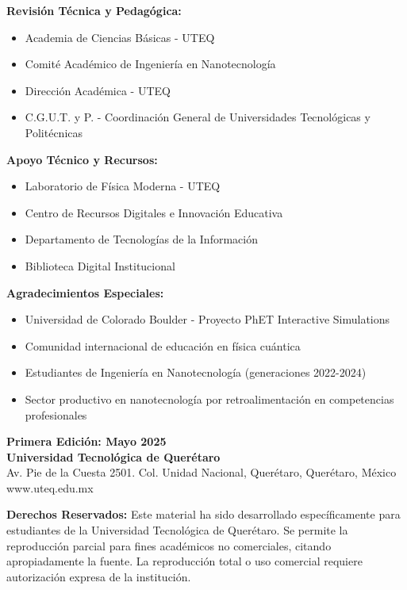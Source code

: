 \begin{tecnologiabox}
\begin{tecnologiabox}
\begin{tecnologiabox}
\begin{teknologiabox}
\begin{tecnologiabox}
\begin{tecnologiabox}
\begin{tecnologiabox}
\textbf{Revisión Técnica y Pedagógica:}
\begin{itemize}[leftmargin=2cm]
\item Academia de Ciencias Básicas - UTEQ
\item Comité Académico de Ingeniería en Nanotecnología
\item Dirección Académica - UTEQ
\item C.G.U.T. y P. - Coordinación General de Universidades Tecnológicas y Politécnicas
\end{itemize}

\textbf{Apoyo Técnico y Recursos:}
\begin{itemize}[leftmargin=2cm]
\item Laboratorio de Física Moderna - UTEQ
\item Centro de Recursos Digitales e Innovación Educativa
\item Departamento de Tecnologías de la Información
\item Biblioteca Digital Institucional
\end{itemize}

\vspace{1cm}

\textbf{Agradecimientos Especiales:}
\begin{itemize}[leftmargin=2cm]
\item Universidad de Colorado Boulder - Proyecto PhET Interactive Simulations
\item Comunidad internacional de educación en física cuántica
\item Estudiantes de Ingeniería en Nanotecnología (generaciones 2022-2024)
\item Sector productivo en nanotecnología por retroalimentación en competencias profesionales
\end{itemize}

\vspace{1cm}

\begin{center}
\textbf{Primera Edición: Mayo 2025}\\
\textbf{Universidad Tecnológica de Querétaro}\\
Av. Pie de la Cuesta 2501. Col. Unidad Nacional, Querétaro, Querétaro, México\\
www.uteq.edu.mx
\end{center}

\vspace{1cm}

\begin{tcolorbox}[colback=gray!10!white,colframe=gray]
\textbf{Derechos Reservados:} Este material ha sido desarrollado específicamente para estudiantes de la Universidad Tecnológica de Querétaro. Se permite la reproducción parcial para fines académicos no comerciales, citando apropiadamente la fuente. La reproducción total o uso comercial requiere autorización expresa de la institución.
\end{tcolorbox}


\end{tecnologiabox}
\end{tecnologiabox}
\end{tecnologiabox}
\end{teknologiabox}
\end{tecnologiabox}
\end{tecnologiabox}
\end{tecnologiabox}
